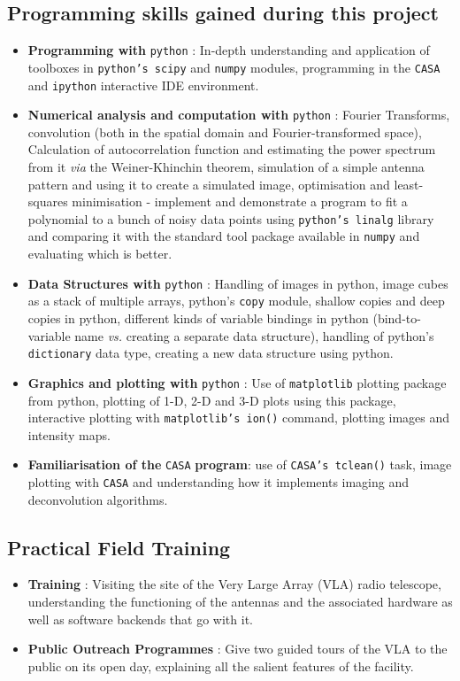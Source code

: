 \documentclass{article}
\begin{document}
\subsection{Programming skills gained during this project}
\begin{itemize}
\item \textbf{Programming with} \texttt{python} : In-depth understanding and application of toolboxes in \texttt{python's scipy} and  \texttt{numpy} modules, programming in the \texttt{CASA} and \texttt{ipython} interactive IDE environment.
\item \textbf{Numerical analysis and computation with }\texttt{python} : Fourier Transforms, convolution (both in the spatial domain and Fourier-transformed space), Calculation of autocorrelation function and estimating the power spectrum from it \textit{via} the Weiner-Khinchin theorem, simulation of a simple antenna pattern and using it to create a simulated image, optimisation and least-squares minimisation - implement and demonstrate a program to fit a polynomial to a bunch of noisy data points using \texttt{python's linalg} library and comparing it with the standard tool package available in \texttt{numpy} and evaluating which is better. 
\item \textbf{Data Structures with }\texttt{python} : Handling of images in python, image cubes as a stack of multiple arrays, python's \texttt{copy} module, shallow copies and deep copies in python, different kinds of variable bindings in python (bind-to-variable name \textit{vs.} creating a separate data structure), handling of python's \texttt{dictionary} data type, creating a new data structure using python. 
\item \textbf{Graphics and plotting with }\texttt{python} : Use of \texttt{matplotlib} plotting package from python, plotting of 1-D, 2-D and 3-D plots using this package, interactive plotting with \texttt{matplotlib's ion()} command, plotting images and intensity maps.
\item \textbf{Familiarisation of the }\texttt{CASA}\textbf{ program}: use of \texttt{CASA's tclean()} task, image plotting with \texttt{CASA} and understanding how it implements imaging and deconvolution algorithms.  
\end{itemize}
\subsection{Practical Field Training}
\begin{itemize}
\item \textbf{Training} : Visiting the site of the Very Large Array (VLA) radio telescope, understanding the functioning of the antennas and the associated hardware as well as software backends that go with it.
\item \textbf{Public Outreach Programmes} : Give two guided tours of the VLA to the public on its open day, explaining all the salient features of the facility.
\end{itemize}
\end{document}

